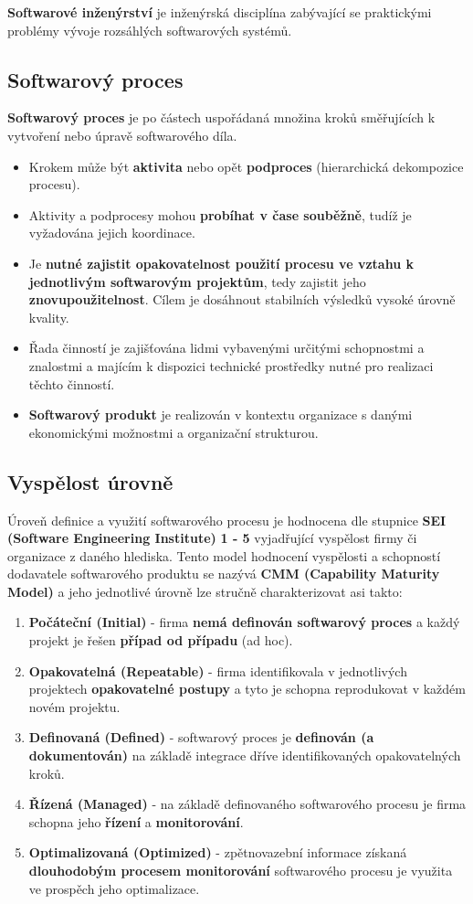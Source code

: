 \textbf{Softwarové inženýrství} je inženýrská disciplína zabývající se praktickými problémy vývoje
rozsáhlých softwarových systémů.

\subsection{Softwarový proces}
\textbf{Softwarový proces} je po částech uspořádaná množina kroků směřujících k vytvoření nebo úpravě softwarového díla.
\begin{itemize}
\item Krokem může být \textbf{aktivita} nebo opět \textbf{podproces} (hierarchická dekompozice procesu). 
\item Aktivity a podprocesy mohou \textbf{probíhat v čase souběžně}, tudíž je vyžadována jejich koordinace. 
\item Je \textbf{nutné zajistit opakovatelnost použití procesu ve vztahu k jednotlivým softwarovým projektům}, tedy zajistit jeho \textbf{znovupoužitelnost}.  Cílem je dosáhnout stabilních výsledků vysoké úrovně kvality.
\item Řada činností je zajišťována lidmi vybavenými určitými schopnostmi a znalostmi a majícím k dispozici technické prostředky nutné pro realizaci těchto činností.
\item \textbf{Softwarový produkt} je realizován v kontextu organizace s danými ekonomickými možnostmi a organizační strukturou.
\end{itemize}

\subsection{Vyspělost úrovně}
Úroveň definice a využití softwarového procesu je hodnocena dle stupnice \textbf{SEI (Software Engineering Institute)} \textbf{1 - 5} vyjadřující vyspělost firmy či organizace z daného hlediska. Tento model hodnocení vyspělosti a schopností dodavatele softwarového produktu se nazývá \textbf{CMM (Capability Maturity Model)} a jeho jednotlivé úrovně lze stručně charakterizovat asi takto:

\begin{enumerate}
\item \textbf{Počáteční (Initial)} - firma \textbf{nemá definován softwarový proces} a každý projekt je řešen \textbf{případ od případu} (ad hoc).
\item \textbf{Opakovatelná (Repeatable)} - firma identifikovala v jednotlivých projektech \textbf{opakovatelné postupy} a tyto je schopna reprodukovat v každém novém projektu.
\item \textbf{Definovaná (Defined)} - softwarový proces je \textbf{definován (a dokumentován)} na základě integrace dříve identifikovaných opakovatelných kroků.
\item \textbf{Řízená (Managed)} - na základě definovaného softwarového procesu je firma schopna jeho \textbf{řízení} a \textbf{monitorování}.
\item \textbf{Optimalizovaná (Optimized)} - zpětnovazební informace získaná \textbf{dlouhodobým procesem monitorování} softwarového procesu je využita ve prospěch jeho optimalizace.
\end{enumerate}

